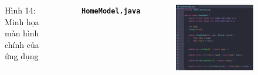 \documentclass{beamer}
\begin{document}
\begin{frame}
\begin{columns}
\begin{figure}
            \caption{\centering\tiny{Hình 14: Minh họa màn hình chính của ứng dụng}}
        \end{figure}
        \indent \textbf{\texttt{HomeModel.java}}
        \begin{figure}
            \centering
            \includegraphics[width=\textwidth]{images/17.png}
        \end{figure}
    \end{columns}
\end{frame}
\end{document}
